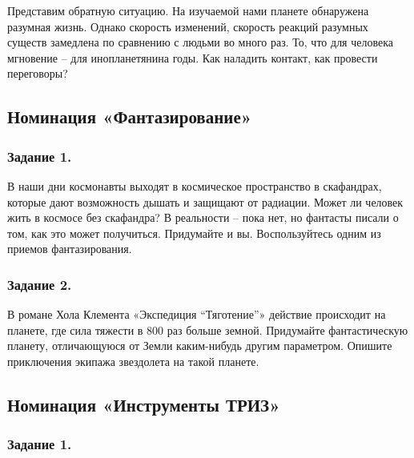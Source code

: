 \documentclass[11pt,a4paper]{article}
\begin{document}
Представим обратную ситуацию. На изучаемой нами планете обнаружена разумная
жизнь. Однако скорость изменений, скорость реакций разумных существ замедлена
по сравнению с людьми во много раз. То, что для человека мгновение – для
инопланетянина годы. Как наладить контакт, как провести переговоры?

\subsection{Номинация «Фантазирование»}

\subsubsection*{Задание 1.}
В наши дни космонавты выходят в космическое пространство в скафандрах, которые
дают возможность дышать и защищают от радиации. Может ли человек жить в
космосе без скафандра? В реальности – пока нет, но фантасты писали о том, как
это может получиться. Придумайте и вы. Воспользуйтесь одним из приемов
фантазирования.

\subsubsection*{Задание 2.}
В романе Хола Клемента «Экспедиция “Тяготение”» действие происходит на
планете, где сила тяжести в 800 раз больше земной. Придумайте фантастическую
планету, отличающуюся от Земли каким-нибудь другим параметром. Опишите
приключения экипажа звездолета на такой планете.

\subsection{Номинация «Инструменты ТРИЗ»}

\subsubsection*{Задание 1.}

\newcommand{\CosmicInventions}{Космические путешествия и исследования – мечта
  многих поколений смелых людей. Есть у этих исследований и чисто практическое
  применение. Вы, конечно, знаете, что тефлоновое покрытие, беспроводные
  электроинструменты, геолокационные сервисы и многие другие изобретения,
  делающие нашу жизнь удобнее и безопаснее, были сделаны в космической
  промышленности. Задания в номинации «Инструменты ТРИЗ» будут связана именно
  с таким изобретениями.
\begin{itemize}[noitemsep]
\item[1)] Соберите картотеку «космических изобретений», получивших
  распространение в обычной жизни.
\item[2)] Сформулируйте противоречия, которые решены в данных изобретениях.
\item[3)] Предложите необычное использование этих изобретений для решения еще
  не поставленных задач.
\end{itemize}}
\end{document}
